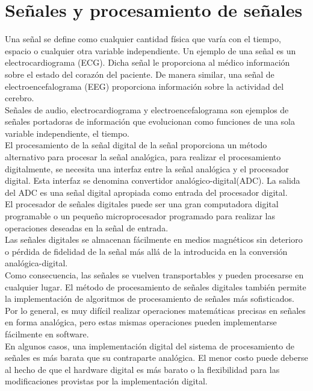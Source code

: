 \section{Señales y procesamiento de señales}
	
	Una señal se define como cualquier cantidad física que varía con el tiempo, espacio o cualquier otra variable independiente. Un ejemplo de una señal es un electrocardiograma (ECG). Dicha señal le proporciona al médico información sobre el estado del corazón del paciente. De manera similar, una señal de electroencefalograma (EEG) proporciona información sobre la actividad del cerebro. \\
	
	Señales de audio, electrocardiograma y electroencefalograma son ejemplos de señales portadoras de información que evolucionan como funciones de una sola variable independiente, el tiempo. \\
	
	El procesamiento de la señal digital de la señal proporciona un método alternativo para procesar la señal analógica, para realizar el procesamiento digitalmente, se necesita una interfaz entre la señal analógica y el procesador digital. Esta interfaz se denomina convertidor analógico-digital(ADC). La salida del ADC es una señal digital apropiada como entrada del procesador digital. \\
	
	El procesador de señales digitales puede ser una gran computadora digital programable o un pequeño microprocesador programado para realizar las operaciones deseadas en la señal de entrada. \\
	
	Las señales digitales se almacenan fácilmente en medios magnéticos sin deterioro o pérdida de fidelidad de la señal más allá de la introducida en la conversión analógica-digital. \\
	
	Como consecuencia, las señales se vuelven transportables y pueden procesarse en cualquier lugar. El método de procesamiento de señales digitales también permite la implementación de algoritmos de procesamiento de señales más sofisticados. Por lo general, es muy difícil realizar operaciones matemáticas precisas en señales en forma analógica, pero estas mismas operaciones pueden implementarse fácilmente en software. \\
	
	En algunos casos, una implementación digital del sistema de procesamiento de señales es más barata que su contraparte analógica. El menor costo puede deberse al hecho de que el hardware digital es más barato o la flexibilidad para las modificaciones provistas por la implementación digital. \\
	
